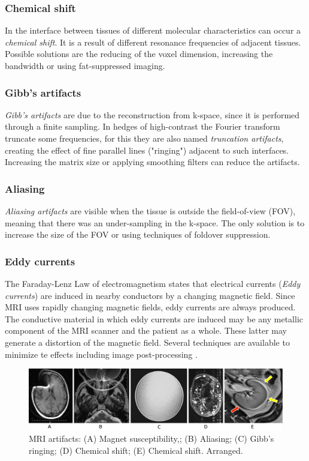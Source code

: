   \subsubsection*{Chemical shift}
  In the interface between tissues of different molecular characteristics can occur a \emph{chemical shift}. It is a result of different resonance frequencies of adjacent tissues. Possible solutions are the reducing of the voxel dimension, increasing the bandwidth or using fat-suppressed imaging. \cite{artifacts}
  \subsubsection*{Gibb's artifacts}
  \emph{Gibb's artifacts} are due to the reconstruction from k-space, since it is performed through a finite sampling. In hedges of high-contrast the Fourier transform truncate some frequencies, for this they are also named \emph{truncation artifacts}, creating the effect of fine parallel lines ("ringing") adjacent to such interfaces. Increasing the matrix size or applying smoothing filters can reduce the artifacts. \cite{artifacts}
  \subsubsection*{Aliasing}
  \emph{Aliasing artifacts} are visible when the tissue is outside the field-of-view (FOV), meaning that there was an under-sampling in the k-space. The only solution is to increase the size of the FOV or using techniques of foldover suppression. \cite{artifacts}
  \subsubsection*{Eddy currents}
  The Faraday-Lenz Law of electromagnetism states that electrical currents (\emph{Eddy currents}) are induced in nearby conductors by a changing magnetic field. Since MRI uses rapidly changing magnetic fields, eddy currents are always produced. The conductive material in which eddy currents are induced may be any metallic component of the MRI scanner and the patient as a whole. These latter may generate a distortion of the magnetic field. Several techniques are available to minimize te effects including image post-processing \cite{QeA_MRI}.

  \begin{figure}[h]
     \centering
     \includegraphics[width=1\textwidth]{images/artifacts.JPG}
     \caption{MRI artifacts: (A) Magnet susceptibility,; (B) Aliasing; (C) Gibb's ringing; (D) Chemical shift; (E) Chemical shift. \cite{artifacts} Arranged.}
     \label{fig:artifacts}
  \end{figure}

